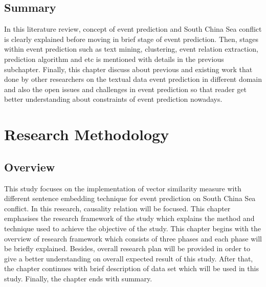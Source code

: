 \documentclass[twoside]{utmthesis}
\begin{document}
\section{Summary}
In this literature review, concept of event prediction and South China Sea conflict is clearly explained before moving in brief stage of event prediction. Then, stages within event prediction such as text mining, clustering, event relation extraction, prediction algorithm and etc is mentioned with details in the previous subchapter. Finally, this chapter discuss about previous and existing work that done by other researchers on the textual data event prediction in different domain and also the open issues and challenges in event prediction so that reader get better understanding about constraints of event prediction nowadays. 



\chapter{Research Methodology}

\section{Overview}
This study focuses on the implementation of vector similarity measure with different sentence embedding technique for event prediction on South China Sea conflict. In this research, causality relation will be focused. This chapter emphasises the research framework of the study which explains the method and technique used to achieve the objective of the study. This chapter begins with the overview of research framework which consists of three phases and each phase will be briefly explained. Besides, overall research plan will be provided in order to give a better understanding on overall expected result of this study. After that, the chapter continues with brief description of data set which will be used in this study. Finally, the chapter ends with summary. 
\end{document}

